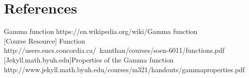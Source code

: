 \documentclass[a4paper, 11pt]{article}
\begin{document}
\section{References}
\indent{} Gamma function https://en.wikipedia.org/wiki/Gamma function\\

[Course Resource] Function http://users.encs.concordia.ca/~kamthan/courses/soen-6011/functions.pdf\\

[Jekyll.math.byuh.edu]Properties of the Gamma function \\
\indent \indent\indent\indent\indent\indent\indent http://www.jekyll.math.byuh.edu/courses/m321/handouts/gammaproperties.pdf
\end{document}
